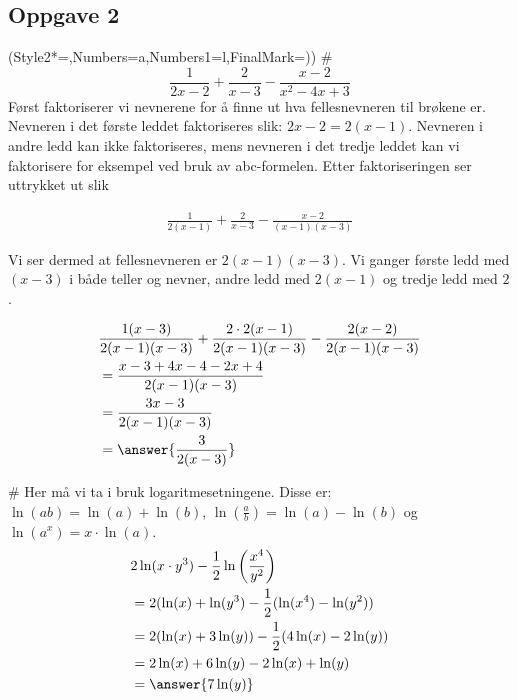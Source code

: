 \subsection*{Oppgave 2}
\begin{easylist}[enumerate]
	\ListProperties(Style2*=,Numbers=a,Numbers1=l,FinalMark={)})
	# 
	\begin{equation*}
		\frac{1}{2x-2} + \frac{2}{x-3} - \frac{x-2}{x^2 - 4x +3}
	\end{equation*}
	Først faktoriserer vi nevnerene for å finne ut hva fellesnevneren til brøkene er. Nevneren i det første leddet faktoriseres slik: $2x-2 = 2(x-1)$. Nevneren i andre ledd kan ikke faktoriseres, mens nevneren i det tredje leddet kan vi faktorisere for eksempel ved bruk av abc-formelen. Etter faktoriseringen ser uttrykket ut slik
	
	\begin{equation*}
		\begin{aligned}
			\frac{1}{2(x-1)} + \frac{2}{x-3} - \frac{x-2}{(x-1)(x-3)}
		\end{aligned}
	\end{equation*}
	
	Vi ser dermed at fellesnevneren er $2(x-1)(x-3)$. Vi ganger første ledd med $(x-3)$ i både teller og nevner, andre ledd med $2(x-1)$ og tredje ledd med $2$.
	
	\begin{equation*}
		\begin{aligned}
			&\frac{1(x-3)}{2(x-1)(x-3)} + \frac{2 \cdot 2(x-1)}{2(x-1)(x-3)} - \frac{2(x-2)}{2(x-1)(x-3)} \\
			& = \frac{x - 3 +4x - 4 - 2x + 4}{2(x-1)(x-3)} \\
													& = \frac{3x-3}{2(x-1)(x-3)}\\
													& = \answer{\frac{3}{2(x-3)}}
		\end{aligned}
	\end{equation*}
	
	# Her må vi ta i bruk logaritmesetningene. Disse er: $\ln(ab) = \ln(a) + \ln(b)$, $\ln\left(\frac{a}{b}\right) = \ln(a) - \ln(b)$ og $\ln(a^x) = x \cdot \ln(a)$.
	\begin{equation*}
		\begin{aligned}
		&2\ln(x\cdot y^3) - \frac{1}{2} \ln \left (\frac{x^4}{y^2} \right) \\
		& = 2(\ln(x) + \ln(y^3) - \frac{1}{2}(\ln(x^4) - \ln(y^2)) \\
		& = 2(\ln(x) + 3\ln(y)) - \frac{1}{2}(4\ln(x) - 2\ln(y))\\
		& = 2\ln(x) + 6\ln(y) - 2\ln(x) + \ln(y)\\
		& = \answer{7\ln(y)}
		\end{aligned}
	\end{equation*}
	
\end{easylist}

